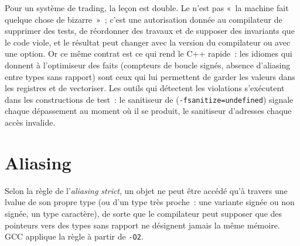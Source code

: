 \label{lst:ll:cpp-for-latency-iii-the-compiler:plus}
\label{lst:ll:cpp-for-latency-iii-the-compiler:null}

Pour un système de trading, la leçon est double. Le  n'est pas «~la machine fait quelque chose de bizarre~»~; c'est une autorisation
donnée au compilateur de supprimer des tests, de réordonner des travaux et de supposer des invariants que le code viole, et le résultat peut changer
avec la version du compilateur ou avec une option. Or ce même contrat est ce qui rend le C++ rapide~: les idiomes qui donnent à l'optimiseur
des faits (compteurs de boucle signés, absence d'aliasing entre types sans rapport) sont ceux qui lui permettent de garder les valeurs dans les registres et
de vectoriser. Les outils qui détectent les violations s'exécutent dans les constructions de test~: le sanitiseur de 
(\texttt{-fsanitize=undefined}) signale chaque dépassement au moment où il se produit, le sanitiseur d'adresses chaque accès invalide.

\section{Aliasing}

\begin{definition}\label{def:ll:cpp-for-latency-iii-the-compiler:alias}
Selon la règle de l'\emph{aliasing strict}, un objet ne peut être accédé qu'à travers une lvalue de son propre
type (ou d'un type très proche~: une variante signée ou non signée, un type caractère), de sorte que le compilateur peut supposer que des pointeurs
vers des types sans rapport ne désignent jamais la même mémoire. GCC applique la règle à partir de \texttt{-O2}.
\end{definition}

\label{lst:ll:cpp-for-latency-iii-the-compiler:alias}

